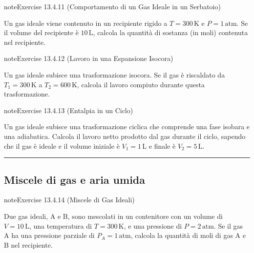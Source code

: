 \documentclass[letterpaper,10pt,italian]{jupyterBook}
\begin{document}
\begin{sphinxadmonition}{note}{Exercise 13.4.11 (Comportamento di un Gas Ideale in un Serbatoio)}



\sphinxAtStartPar
Un gas ideale viene contenuto in un recipiente rigido a \(T = 300 \, \text{K}\) e \(P = 1 \, \text{atm}\). Se il volume del recipiente è \(10 \, \text{L}\), calcola la quantità di sostanza (in moli) contenuta nel recipiente.
\end{sphinxadmonition}
 \label{exercise:ch/thermodynamics/matter-problems-exercise-11}

\begin{sphinxadmonition}{note}{Exercise 13.4.12 (Lavoro in una Espansione Isocora)}



\sphinxAtStartPar
Un gas ideale subisce una trasformazione isocora. Se il gas è riscaldato da \(T_1 = 300 \, \text{K}\) a \(T_2 = 600 \, \text{K}\), calcola il lavoro compiuto durante questa trasformazione.
\end{sphinxadmonition}
 \label{exercise:ch/thermodynamics/matter-problems-exercise-12}

\begin{sphinxadmonition}{note}{Exercise 13.4.13 (Entalpia in un Ciclo)}



\sphinxAtStartPar
Un gas ideale subisce una trasformazione ciclica che comprende una fase isobara e una adiabatica. Calcola il lavoro netto prodotto dal gas durante il ciclo, sapendo che il gas è ideale e il volume iniziale è \(V_1 = 1 \, \text{L}\) e finale è \(V_2 = 5 \, \text{L}\).
\end{sphinxadmonition}


\bigskip\hrule\bigskip



\subsection{Miscele di gas e aria umida}
\label{\detokenize{ch/thermodynamics/matter-problems:miscele-di-gas-e-aria-umida}} \label{exercise:ch/thermodynamics/matter-problems-exercise-13}

\begin{sphinxadmonition}{note}{Exercise 13.4.14 (Miscele di Gas Ideali)}



\sphinxAtStartPar
Due gas ideali, A e B, sono mescolati in un contenitore con un volume di \(V = 10 \, \text{L}\), una temperatura di \(T = 300 \, \text{K}\), e una pressione di \(P = 2 \, \text{atm}\). Se il gas A ha una pressione parziale di \(P_A = 1 \, \text{atm}\), calcola la quantità di moli di gas A e B nel recipiente.
\end{sphinxadmonition}
 \label{exercise:ch/thermodynamics/matter-problems-exercise-14}
\end{document}
